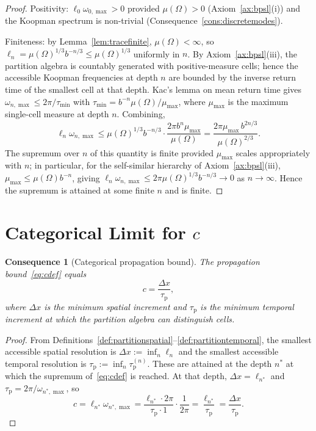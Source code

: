 \documentclass[11pt,twocolumn,a4paper]{article}
\theoremstyle{axiomstyle}
\theoremstyle{conseqstyle}
\newtheorem{consequence}{Consequence}
\theoremstyle{definition}
\theoremstyle{remark}
\newcommand{\taup}{\tau_{\mathrm{p}}}
\begin{document}
\begin{proof}
Positivity: $\ell_{0}\omega_{0,\max}>0$ provided $\mu(\Omega)>0$ (Axiom~\ref{ax:bpsl}(i)) and the Koopman spectrum is non-trivial (Consequence~\ref{cons:discretemodes}).

Finiteness: by Lemma~\ref{lem:tracefinite}, $\mu(\Omega)<\infty$, so $\ell_{n}=\mu(\Omega)^{1/3}b^{-n/3}\le\mu(\Omega)^{1/3}$ uniformly in $n$. By Axiom~\ref{ax:bpsl}(iii), the partition algebra is countably generated with positive-measure cells; hence the accessible Koopman frequencies at depth $n$ are bounded by the inverse return time of the smallest cell at that depth. Kac's lemma \citep{kac1947} on mean return time gives $\omega_{n,\max}\le 2\pi/\tau_{\min}$ with $\tau_{\min}=b^{-n}\mu(\Omega)/\mu_{\max}$, where $\mu_{\max}$ is the maximum single-cell measure at depth $n$. Combining,
\begin{equation*}
\ell_{n}\omega_{n,\max}\le\mu(\Omega)^{1/3}b^{-n/3}\cdot\frac{2\pi b^{n}\mu_{\max}}{\mu(\Omega)}=\frac{2\pi\mu_{\max}\,b^{2n/3}}{\mu(\Omega)^{2/3}}.
\end{equation*}
The supremum over $n$ of this quantity is finite provided $\mu_{\max}$ scales appropriately with $n$; in particular, for the self-similar hierarchy of Axiom~\ref{ax:bpsl}(iii), $\mu_{\max}\le\mu(\Omega)b^{-n}$, giving $\ell_{n}\omega_{n,\max}\le 2\pi\mu(\Omega)^{1/3}b^{-n/3}\to 0$ as $n\to\infty$. Hence the supremum is attained at some finite $n$ and is finite.
\end{proof}

\section{Categorical Limit for $c$}
\label{sec:categoricalc}

\begin{consequence}[Categorical propagation bound]
\label{cons:categoricalc}
The propagation bound~\eqref{eq:cdef} equals
\begin{equation}
c=\frac{\Delta x}{\taup},
\label{eq:ccategorical}
\end{equation}
where $\Delta x$ is the minimum spatial increment and $\taup$ is the minimum temporal increment at which the partition algebra can distinguish cells.
\end{consequence}

\begin{proof}
From Definitions~\ref{def:partitionspatial}--\ref{def:partitiontemporal}, the smallest accessible spatial resolution is $\Delta x:=\inf_{n}\ell_{n}$ and the smallest accessible temporal resolution is $\taup:=\inf_{n}\taup^{(n)}$. These are attained at the depth $n^{*}$ at which the supremum of~\eqref{eq:cdef} is reached. At that depth, $\Delta x=\ell_{n^{*}}$ and $\taup=2\pi/\omega_{n^{*},\max}$, so
\begin{equation*}
c=\ell_{n^{*}}\omega_{n^{*},\max}=\frac{\ell_{n^{*}}\cdot 2\pi}{\taup\cdot 1}\cdot\frac{1}{2\pi}=\frac{\ell_{n^{*}}}{\taup}=\frac{\Delta x}{\taup}.
\end{equation*}
\end{proof}
\end{document}
